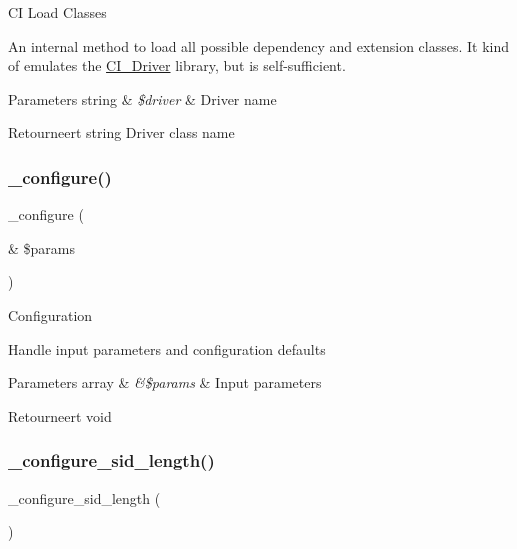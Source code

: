 CI Load Classes

An internal method to load all possible dependency and extension classes. It kind of emulates the \mbox{\hyperlink{class_c_i___driver}{C\+I\+\_\+\+Driver}} library, but is self-\/sufficient.


\begin{DoxyParams}[1]{Parameters}
string & {\em \$driver} & Driver name \\
\hline
\end{DoxyParams}
\begin{DoxyReturn}{Retourneert}
string Driver class name 
\end{DoxyReturn}
\mbox{\label{class_c_i___session_a71e7f49b0627505b4a7dbc8ce368279b}} 
\subsubsection{\texorpdfstring{\_configure()}{\_configure()}}
{\footnotesize\ttfamily \+\_\+configure (\begin{DoxyParamCaption}\item[{\&}]{\$params }\end{DoxyParamCaption})\hspace{0.3cm}{\ttfamily [protected]}}

Configuration

Handle input parameters and configuration defaults


\begin{DoxyParams}[1]{Parameters}
array & {\em \&\$params} & Input parameters \\
\hline
\end{DoxyParams}
\begin{DoxyReturn}{Retourneert}
void 
\end{DoxyReturn}
\mbox{\label{class_c_i___session_af85033c81c047ceeec26aa087d5ba459}} 
\subsubsection{\texorpdfstring{\_configure\_sid\_length()}{\_configure\_sid\_length()}}
{\footnotesize\ttfamily \+\_\+configure\+\_\+sid\+\_\+length (\begin{DoxyParamCaption}{ }\end{DoxyParamCaption})\hspace{0.3cm}{\ttfamily [protected]}}

